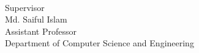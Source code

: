 \documentclass{standalone}
\begin{document}
\begin{titlepage}
\begin{multicols}{3}
\begin{flushleft}
				\end{flushleft}
				
				\begin{flushleft}
				\hrulefill \\
					{\hspace{0.5mm}Supervisor\\\hspace{0.5mm}Md. Saiful Islam\\\hspace{0.5mm}Assistant Professor\\\hspace{0.5mm}Department of Computer Science and Engineering}\\%
				\end{flushleft}
				\end{multicols}
\end{titlepage}
\end{document}
